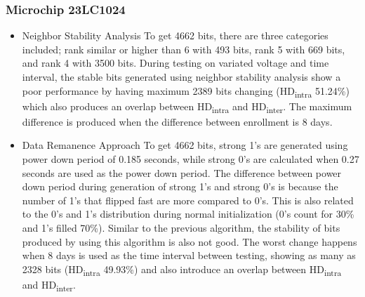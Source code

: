 \subsubsection{Microchip 23LC1024}
\begin{itemize}
  \item Neighbor Stability Analysis\newline
  To get 4662 bits, there are three categories included; rank similar or higher than 6 with 493 bits, rank 5 with 669 bits, and rank 4 with 3500 bits.
  During testing on variated voltage and time interval, the stable bits generated using neighbor stability analysis show a poor performance by having maximum 2389 bits changing  (HD\textsubscript{intra} 51.24\%) which also produces an overlap between HD\textsubscript{intra} and HD\textsubscript{inter}. The maximum difference is produced when the difference between enrollment is 8 days.

  \item Data Remanence Approach\newline
  To get 4662 bits, strong 1's are generated using power down period of 0.185 seconds, while strong 0's are calculated when 0.27 seconds are used as the power down period. The difference between power down period during generation of strong 1's and strong 0's is because the number of 1's that flipped fast are more compared to 0's. This is also related to the 0's and 1's distribution during normal initialization (0's count for 30\% and 1's filled 70\%).
  Similar to the previous algorithm, the stability of bits produced by using this algorithm is also not good. The worst change happens when 8 days is used as the time interval between testing, showing as many as 2328 bits (HD\textsubscript{intra} 49.93\%) and also introduce an overlap between HD\textsubscript{intra} and HD\textsubscript{inter}.
\end{itemize}

